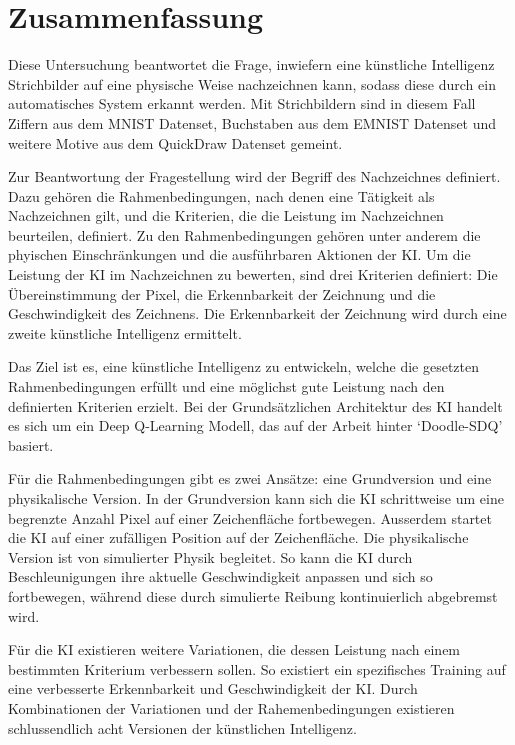 \chapter{Zusammenfassung}\label{zusammenfassung}
Diese Untersuchung beantwortet die Frage, inwiefern eine künstliche Intelligenz
Strichbilder auf eine physische Weise nachzeichnen kann, sodass diese durch ein
automatisches System erkannt werden. Mit Strichbildern sind in diesem
Fall Ziffern aus dem MNIST Datenset, Buchstaben aus dem EMNIST Datenset und
weitere Motive aus dem QuickDraw Datenset gemeint. 

Zur Beantwortung der Fragestellung wird der Begriff des Nachzeichnes definiert.
Dazu gehören die Rahmenbedingungen, nach denen eine Tätigkeit als Nachzeichnen
gilt, und die Kriterien, die die Leistung im Nachzeichnen beurteilen, definiert. Zu den
Rahmenbedingungen gehören unter anderem die phyischen Einschränkungen und die
ausführbaren Aktionen der KI. Um die Leistung der KI im Nachzeichnen zu
bewerten, sind drei Kriterien definiert: Die Übereinstimmung der Pixel, die
Erkennbarkeit der Zeichnung und die Geschwindigkeit des Zeichnens. Die
Erkennbarkeit der Zeichnung wird durch eine zweite künstliche Intelligenz
ermittelt.

Das Ziel ist es, eine künstliche Intelligenz zu entwickeln, welche die gesetzten
Rahmenbedingungen erfüllt und eine möglichst gute Leistung nach den definierten
Kriterien erzielt. Bei der Grundsätzlichen Architektur des KI handelt es sich um
ein Deep Q-Learning Modell, das auf der Arbeit hinter `Doodle-SDQ' \cite{zhou_learning_2018}
basiert.

Für die Rahmenbedingungen gibt es zwei Ansätze: eine Grundversion und eine
physikalische Version. In der Grundversion kann sich die KI schrittweise um eine
begrenzte Anzahl Pixel auf einer Zeichenfläche fortbewegen. Ausserdem startet
die KI auf einer zufälligen Position auf der Zeichenfläche. Die physikalische
Version ist von simulierter Physik begleitet. So kann die KI durch
Beschleunigungen ihre aktuelle Geschwindigkeit anpassen und sich so fortbewegen,
während diese durch simulierte Reibung kontinuierlich abgebremst wird. 

Für die KI existieren weitere Variationen, die dessen Leistung nach einem
bestimmten Kriterium verbessern sollen. So existiert ein spezifisches Training
auf eine verbesserte Erkennbarkeit und Geschwindigkeit der KI. Durch
Kombinationen der Variationen und der Rahemenbedingungen existieren
schlussendlich acht Versionen der künstlichen Intelligenz.


